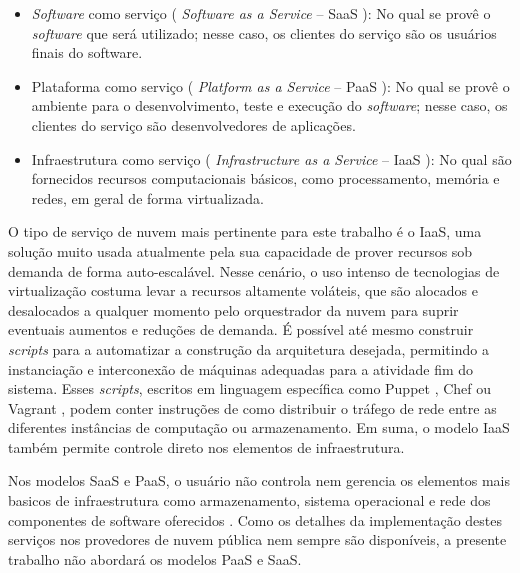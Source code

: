 \begin{itemize}
	\item \textit{Software} como serviço ( \textit{Software as a Service} -- SaaS ): No qual se provê o \textit{software} que será utilizado; nesse caso, os clientes do serviço são os usuários finais do software.
	
	\item Plataforma como serviço ( \textit{Platform as a Service} -- PaaS ): No qual se provê o ambiente para o desenvolvimento, teste e execução do \textit{software}; nesse caso, os clientes do serviço são desenvolvedores de aplicações.
	
	\item Infraestrutura como serviço ( \textit{Infrastructure as a Service} -- IaaS ): No qual são fornecidos recursos computacionais básicos, como processamento, memória e redes, em geral de forma virtualizada.
\end{itemize}

O tipo de serviço de nuvem mais pertinente para este trabalho é o IaaS, uma solução muito usada atualmente pela sua capacidade de prover recursos sob demanda de forma auto-escalável.
%
Nesse cenário, o uso intenso de tecnologias de virtualização costuma levar a recursos altamente voláteis, que são alocados e desalocados a qualquer momento pelo orquestrador da nuvem para suprir eventuais aumentos e reduções de demanda.
%
É possível até mesmo construir \textit{scripts} para a automatizar a construção da arquitetura desejada, permitindo a instanciação e interconexão de máquinas adequadas para a atividade fim do sistema.
%
Esses \textit{scripts}, escritos em linguagem específica como Puppet \cite{Puppet2018}, Chef \cite{Chef2018} ou Vagrant \cite{Vagrant2018}, podem conter instruções de como distribuir o tráfego de rede entre as diferentes instâncias de computação ou armazenamento.
%
Em suma, o modelo IaaS também permite controle direto nos elementos de infraestrutura. %
%

Nos modelos SaaS e PaaS, o usuário não controla nem gerencia os elementos mais basicos de infraestrutura como armazenamento, sistema operacional e rede dos componentes de software oferecidos \cite{NIST2011}. 
%
Como os detalhes da implementação destes serviços nos provedores de nuvem pública nem sempre são disponíveis, a presente trabalho não abordará os modelos PaaS e SaaS.
%


